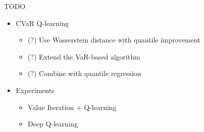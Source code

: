 \documentclass{beamer}
\begin{document}
\begin{frame}{TODO}

\begin{itemize}
\item CVaR Q-learning
\begin{itemize}
\item (?) Use Wasserstein distance with quantile improvement
\item (?) Extend the VaR-based algorithm
\item (?) Combine with quantile regression
\end{itemize}

\item Experiments
\begin{itemize}
\item Value Iteration + Q-learning
\item Deep Q-learning
\end{itemize}
\end{itemize}
\end{frame}
\end{document}

